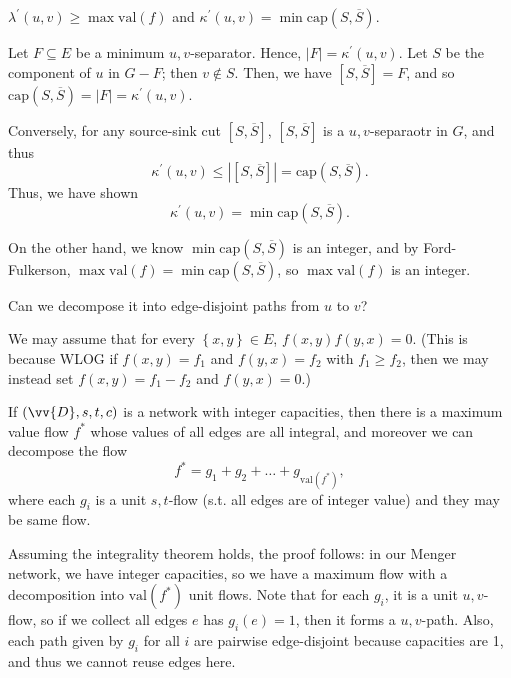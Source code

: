 \begin{claim}
    \(\lambda ^{\prime} (u, v) \ge \max \mathrm{val}(f) \) and \(\kappa ^{\prime} (u, v) = \min \mathrm{cap}(S, \overline{S}) \).  
\end{claim}
\begin{explanation}
    Let \(F \subseteq E\) be a minimum \(u, v\)-separator. Hence, \(\vert F \vert = \kappa ^{\prime} (u, v) \). Let \(S\) be the component of \(u\) in \(G - F\); then \(v \notin S\). Then, we have \([S, \overline{S}] = F\), and so \(\mathrm{cap}(S, \overline{S}) = \vert F \vert = \kappa ^{\prime} (u, v) \).

    Conversely, for any source-sink cut \([S, \overline{S}]\), \([S, \overline{S}]\) is a \(u, v\)-separaotr in \(G\), and thus 
    \[
        \kappa ^{\prime} (u, v) \le \left\vert [S, \overline{S}] \right\vert = \mathrm{cap}(S, \overline{S}).  
    \] 
    Thus, we have shown 
    \[
        \kappa ^{\prime} (u, v) = \min \mathrm{cap}(S, \overline{S}).
    \]   

    On the other hand, we know \(\min \mathrm{cap}(S, \overline{S}) \) is an integer, and by Ford-Fulkerson, \(\max \mathrm{val}(f) = \min \mathrm{cap}(S, \overline{S})\), so \(\max \mathrm{val} (f) \) is an integer. 

    \begin{question}
        Can we decompose it into edge-disjoint paths from \(u\) to \(v\)?  
    \end{question}   

    We may assume that for every \(\left\{ x, y \right\} \in E \), \(f(x, y) f(y, x) = 0\). (This is because WLOG if \(f(x, y) = f_1\) and \(f(y, x) = f_2\) with \(f_1 \ge f_2\), then we may instead set \(f(x, y) = f_1 - f_2\) and \(f(y, x) = 0\).)

    \begin{theorem}
        If \((\vv{D}, s, t, c)\) is a network with integer capacities, then there is a maximum value flow \(f^*\) whose values of all edges are all integral, and moreover we can decompose the flow
        \[
            f^* = g_1 + g_2 + \dots + g_{\mathrm{val}(f^*)},
        \]   
        where each \(g_i\) is a unit \(s, t\)-flow (s.t. all edges are of integer value) and they may be same flow.  
    \end{theorem}  

    Assuming the integrality theorem holds, the proof follows: in our Menger network, we have integer capacities, so we have a maximum flow with a decomposition into \(\mathrm{val}(f^*) \) unit flows. Note that for each \(g_i\), it is a unit \(u, v\)-flow, so if we collect all edges \(e\) has \(g_i(e) = 1\), then it forms a \(u, v\)-path.    Also, each path given by \(g_i\) for all \(i\) are pairwise edge-disjoint because capacities are 1, and thus we cannot reuse edges here.   
\end{explanation}

